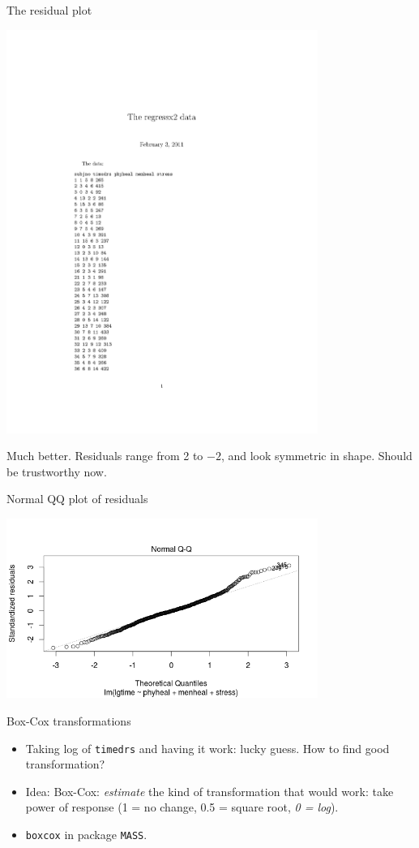 \documentclass{beamer}
\begin{document}
\begin{frame}[fragile]{The residual plot}

\includegraphics[width=4in]{regressx2}

Much better. Residuals range from 2 to $-2$, and look symmetric in shape. Should be trustworthy now.
  
\end{frame}

\begin{frame}[fragile]{Normal QQ plot of residuals}

\includegraphics[width=4in]{regressx2a}

  
\end{frame}

\begin{frame}[fragile]{Box-Cox transformations}


  \begin{itemize}
  \item Taking log of \verb-timedrs- and having it work: lucky
    guess. How to find good transformation?
  \item Idea: Box-Cox: {\em estimate} the kind of transformation that
    would work: take power of response (1 = no change, 0.5 = square
    root, {\em 0 = log}).
  \item \texttt{boxcox} in package \texttt{MASS}.
  \end{itemize}

\end{frame}
\end{document}

